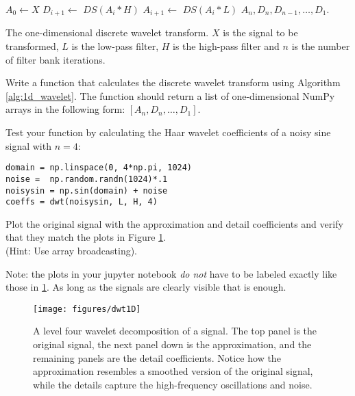 \begin{algorithm}[H]
\begin{algorithmic}[1]
    \State $A_0 \gets X$            
        \State $D_{i+1} \gets \,\,DS(A_i * H)$ 
        \State $A_{i+1} \gets \,\,DS(A_i * L)$ 
    \EndFor
    \State {} $A_n,D_n, D_{n-1},\ldots, D_1$.
\EndProcedure
\end{algorithmic}
\caption{The one-dimensional discrete wavelet transform. $X$ is the signal to be transformed, $L$ is the low-pass filter, $H$ is the high-pass filter and $n$ is the number of
filter bank iterations.}
\label{alg:1d_wavelet}
\end{algorithm}

\begin{problem}
Write a function that calculates the discrete wavelet transform using Algorithm \ref{alg:1d_wavelet}.
The function should return a list of one-dimensional NumPy arrays in the following form: $[A_n, D_n, \ldots, D_1]$.


Test your function by calculating the Haar wavelet coefficients of a noisy sine signal with $n=4$:

\begin{lstlisting}
domain = np.linspace(0, 4*np.pi, 1024)
noise =  np.random.randn(1024)*.1
noisysin = np.sin(domain) + noise
coeffs = dwt(noisysin, L, H, 4)
\end{lstlisting}

Plot the original signal with the approximation and detail coefficients and verify that they match the plots in Figure \ref{fig:dwt1D}.
\\ (Hint: Use array broadcasting).

Note: the plots in your jupyter notebook \textit{do not} have to be labeled exactly like those in \ref{fig:dwt1D}. As long as the signals are clearly visible that is enough.
\label{prob:dwt1D}
\end{problem}

\begin{figure}[H]
\centering
\texttt{[image: figures/dwt1D]}
\caption{A level four wavelet decomposition of a signal.
The top panel is the original signal, the next panel down is the approximation, and the remaining panels are the detail coefficients.
Notice how the approximation resembles a smoothed version of the original signal, while the details capture the high-frequency oscillations and noise.}
\label{fig:dwt1D}
\end{figure}


